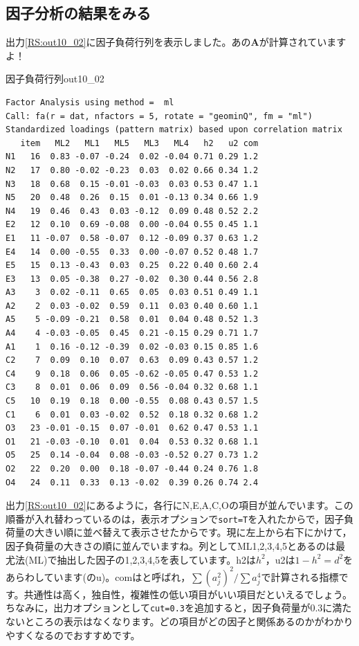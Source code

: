 \documentclass{ltjsbook}
\begin{document}
\subsection{因子分析の結果をみる}
出力\ref{RS:out10_02}に因子負荷行列を表示しました。あの$\bm{A}$が計算されていますよ！

\begin{Rscreen}{因子負荷行列}{out10_02}
	\begin{verbatim}
Factor Analysis using method =  ml
Call: fa(r = dat, nfactors = 5, rotate = "geominQ", fm = "ml")
Standardized loadings (pattern matrix) based upon correlation matrix
   item   ML2   ML1   ML5   ML3   ML4   h2   u2 com
N1   16  0.83 -0.07 -0.24  0.02 -0.04 0.71 0.29 1.2
N2   17  0.80 -0.02 -0.23  0.03  0.02 0.66 0.34 1.2
N3   18  0.68  0.15 -0.01 -0.03  0.03 0.53 0.47 1.1
N5   20  0.48  0.26  0.15  0.01 -0.13 0.34 0.66 1.9
N4   19  0.46  0.43  0.03 -0.12  0.09 0.48 0.52 2.2
E2   12  0.10  0.69 -0.08  0.00 -0.04 0.55 0.45 1.1
E1   11 -0.07  0.58 -0.07  0.12 -0.09 0.37 0.63 1.2
E4   14  0.00 -0.55  0.33  0.00 -0.07 0.52 0.48 1.7
E5   15  0.13 -0.43  0.03  0.25  0.22 0.40 0.60 2.4
E3   13  0.05 -0.38  0.27 -0.02  0.30 0.44 0.56 2.8
A3    3  0.02 -0.11  0.65  0.05  0.03 0.51 0.49 1.1
A2    2  0.03 -0.02  0.59  0.11  0.03 0.40 0.60 1.1
A5    5 -0.09 -0.21  0.58  0.01  0.04 0.48 0.52 1.3
A4    4 -0.03 -0.05  0.45  0.21 -0.15 0.29 0.71 1.7
A1    1  0.16 -0.12 -0.39  0.02 -0.03 0.15 0.85 1.6
C2    7  0.09  0.10  0.07  0.63  0.09 0.43 0.57 1.2
C4    9  0.18  0.06  0.05 -0.62 -0.05 0.47 0.53 1.2
C3    8  0.01  0.06  0.09  0.56 -0.04 0.32 0.68 1.1
C5   10  0.19  0.18  0.00 -0.55  0.08 0.43 0.57 1.5
C1    6  0.01  0.03 -0.02  0.52  0.18 0.32 0.68 1.2
O3   23 -0.01 -0.15  0.07 -0.01  0.62 0.47 0.53 1.1
O1   21 -0.03 -0.10  0.01  0.04  0.53 0.32 0.68 1.1
O5   25  0.14 -0.04  0.08 -0.03 -0.52 0.27 0.73 1.2
O2   22  0.20  0.00  0.18 -0.07 -0.44 0.24 0.76 1.8
O4   24  0.11  0.33  0.13 -0.02  0.39 0.26 0.74 2.4
\end{verbatim}
\end{Rscreen}
出力\ref{RS:out10_02}にあるように，各行にN,E,A,C,Oの項目が並んでいます。この順番が入れ替わっているのは，表示オプションで\verb|sort=T|を入れたからで，因子負荷量の大きい順に並べ替えて表示させたからです。現に左上から右下にかけて，因子負荷量の大きさの順に並んでいますね。列としてML1,2,3,4,5とあるのは最尤法(ML)で抽出した因子の1,2,3,4,5を表しています。h2は$h^2$，u2は$1-h^2=d^2$をあらわしています(のu)。comはと呼ばれ，$\sum (a_j^2)^2/\sum a_j^4$で計算される指標です。共通性は高く，独自性，複雑性の低い項目がいい項目だといえるでしょう。ちなみに，出力オプションとして\verb|cut=0.3|を追加すると，因子負荷量が0.3に満たないところの表示はなくなります。どの項目がどの因子と関係あるのかがわかりやすくなるのでおすすめです。
\end{document}
